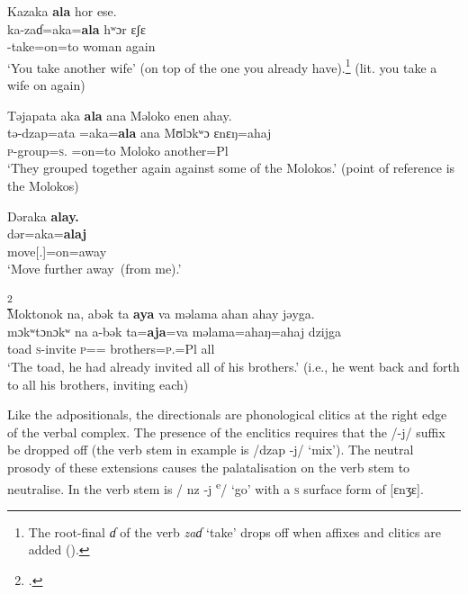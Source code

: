 \ea\label{ex:7:103}
Kazaka  \textbf{ala}  hor  ese.\\
\gll  ka-zaɗ=aka=\textbf{ala}     hʷɔr  ɛʃɛ\\
      {\twoS}-take=on=to    woman  again\\
\glt  ‘You take another wife’ (on top of the one you already have).\footnote{The root-final \textit{ɗ} of the verb \textit{zaɗ} ‘take’ drops off when affixes and clitics are added ().} (lit. you take a wife on again)\\
\z 

\ea\label{ex:7:104}
Təjapata  aka  \textbf{ala}  ana  Məloko  enen  ahay.\\
\gll  tə-dzap=ata  =aka=\textbf{ala}     ana  Mʊlɔkʷɔ    ɛnɛŋ=ahaj\\
      \textsc{p}-group=\textsc{s}.{\IO}  =on=to     {\DAT}  Moloko    another=Pl\\
\glt  ‘They grouped together again against some of the Molokos.’ (point of reference is the Molokos)\\
\z 

\ea\label{ex:7:105}
Dəraka \textbf{alay.}\\
\gll  dər=aka=\textbf{alaj}\\
      move[{\twoS}.{\IMP}]=on=away\\
\glt  ‘Move further away~(from me).’\\
\z 

\ea\label{ex:7:106}\footnote{\citealt{Friesen2003}.}\\
Moktonok na,  abək  ta  \textbf{aya}  va  məlama  ahan  ahay  jəyga.\\
\gll  mɔkʷtɔnɔkʷ na  a-bək          ta=\textbf{aja}=va  məlama=ahaŋ=ahaj  dzijga\\
      toad    {\PSP}  \textsc{s}-invite   \textsc{p}={\PLU}={\PRF}  brothers=\textsc{p}.{\POSS}=Pl  all\\
\glt  ‘The toad, he had already invited all of his brothers.’  (i.e., he went back and forth to all his brothers, inviting each)\\
\z 

Like the adpositionals, the directionals are phonological clitics at the right edge of the verbal complex.  The presence of the enclitics requires that the /-j/ suffix be dropped off (the verb stem in example  is /dzap -j/ ‘mix’). The neutral prosody of these extensions causes the palatalisation on the verb stem to neutralise. In  the verb stem is / nz -j \textsuperscript{e}/ ‘go’ with a \textsc{s} surface form of [ɛnʒɛ].  

